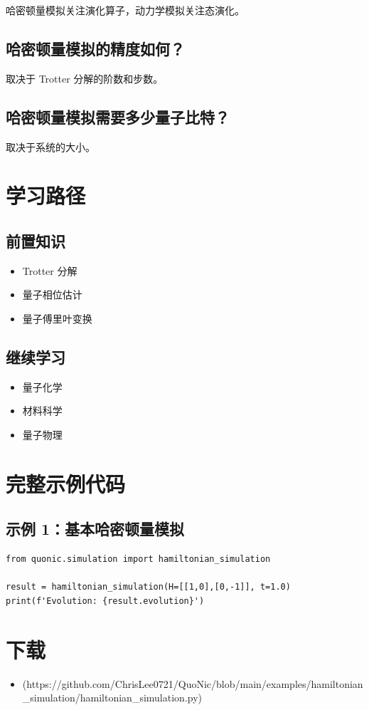 \documentclass[12pt,a4paper]{article}
\begin{document}
哈密顿量模拟关注演化算子，动力学模拟关注态演化。

\subsection{哈密顿量模拟的精度如何？}

取决于 Trotter 分解的阶数和步数。

\subsection{哈密顿量模拟需要多少量子比特？}

取决于系统的大小。

\section{学习路径}

\subsection{前置知识}
\begin{itemize}
  \item Trotter 分解
  \item 量子相位估计
  \item 量子傅里叶变换
\end{itemize}

\subsection{继续学习}
\begin{itemize}
  \item 量子化学
  \item 材料科学
  \item 量子物理
\end{itemize}

\section{完整示例代码}

\subsection{示例 1：基本哈密顿量模拟}

\begin{verbatim}
from quonic.simulation import hamiltonian_simulation

result = hamiltonian_simulation(H=[[1,0],[0,-1]], t=1.0)
print(f'Evolution: {result.evolution}')
\end{verbatim}

\section{下载}

\begin{itemize}
  \item [hamiltonian\_simulation.py](https://github.com/ChrisLee0721/QuoNic/blob/main/examples/hamiltonian_simulation/hamiltonian_simulation.py)
\end{itemize}
\end{document}
